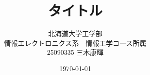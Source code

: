 \documentclass[12pt]{jbook}
\begin{document}
\title{タイトル}
\author{北海道大学工学部\\
情報エレクトロニクス系　情報工学コース所属\\
25090335 三木康暉}
\date{\today}
\maketitle

\clearpage
\end{document}
